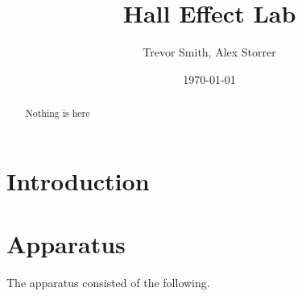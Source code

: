 \documentclass[aps,prl,reprint]{revtex4-2}
\begin{document}

\title{Hall Effect Lab}


\author{Trevor Smith, Alex Storrer}


\date{\today}

\begin{abstract}
	Nothing is here
\end{abstract}


\maketitle

\section{Introduction}

\section{Apparatus}

The apparatus consisted of the following.
\begin{itemize}
\end{itemize}
\end{document}
